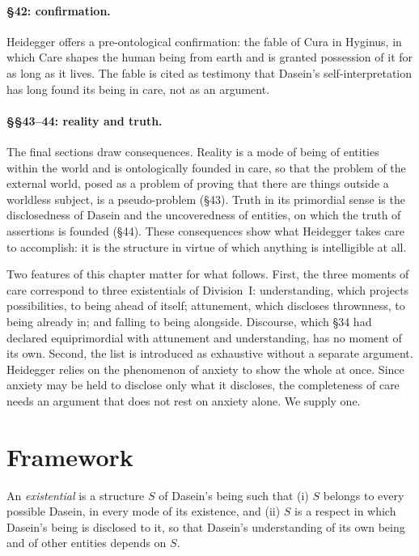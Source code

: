 \documentclass{situationist-preprint}
\begin{document}
\paragraph{\S42: confirmation.} Heidegger offers a pre-ontological confirmation: the fable of Cura in Hyginus, in which Care shapes the human being from earth and is granted possession of it for as long as it lives. The fable is cited as testimony that Dasein's self-interpretation has long found its being in care, not as an argument.

\paragraph{\S\S43--44: reality and truth.} The final sections draw consequences. Reality is a mode of being of entities within the world and is ontologically founded in care, so that the problem of the external world, posed as a problem of proving that there are things outside a worldless subject, is a pseudo-problem (\S43). Truth in its primordial sense is the disclosedness of Dasein and the uncoveredness of entities, on which the truth of assertions is founded (\S44). These consequences show what Heidegger takes care to accomplish: it is the structure in virtue of which anything is intelligible at all.

Two features of this chapter matter for what follows. First, the three moments of care correspond to three existentials of Division~I: understanding, which projects possibilities, to being ahead of itself; attunement, which discloses thrownness, to being already in; and falling to being alongside. Discourse, which \S34 had declared equiprimordial with attunement and understanding, has no moment of its own. Second, the list is introduced as exhaustive without a separate argument. Heidegger relies on the phenomenon of anxiety to show the whole at once. Since anxiety may be held to disclose only what it discloses, the completeness of care needs an argument that does not rest on anxiety alone. We supply one.

\section{Framework}\label{s:frame}

\begin{definition}[Existential]\label{d:exist}
An \emph{existential} is a structure $S$ of Dasein's being such that (i) $S$ belongs to every possible Dasein, in every mode of its existence, and (ii) $S$ is a respect in which Dasein's being is disclosed to it, so that Dasein's understanding of its own being and of other entities depends on $S$.
\end{definition}
\end{document}
